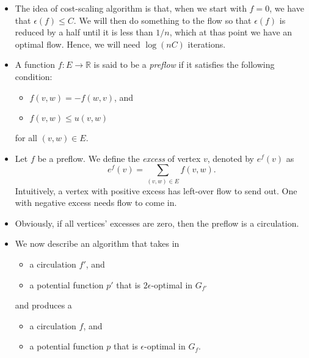 \documentclass[10pt]{article}
\begin{document}
\begin{itemize}
\begin{proof}
          Now, for any cycle of length more than $n$, we can break it to
          a number of cycles of length at most $n$. So, its cost is greater
          than or equal to 0 as well. In conclusion, there is no negative-cost
          cycle, and $f$ is optimal.
        \end{proof}
      
      \item The idea of cost-scaling algorithm is that, when we start with $f = 0$,
        we have that $\epsilon(f) \leq C.$ We will then do something to the flow
        so that $\epsilon(f)$ is reduced by a half until it is less than $1/n$,
        which at thas point we have an optimal flow. Hence, we will need $\log(nC)$
        iterations.
        
      \item A function $f: E \rightarrow \mathbb{R}$ is said to be a \emph{preflow}
        if it satisfies the following condition:
        \begin{itemize}
          \item $f(v,w) = -f(w,v)$, and
          \item $f(v,w) \leq u(v,w)$
        \end{itemize}
        for all $(v,w) \in E.$
        
      \item Let $f$ be a preflow. We define the \emph{excess} of vertex $v$, denoted
        by $e^f(v)$ as $$e^f(v) = \sum_{(v,w) \in E} f(v,w).$$
        Intuitively, a vertex with positive excess has left-over flow to send out. 
        One with negative excess needs flow to come in.
        
      \item Obviously, if all vertices' excesses are zero, then the preflow
        is a circulation.
        
      \item We now describe an algorithm that takes in 
        \begin{itemize}
          \item a circulation $f'$, and
          \item a potential function $p'$ that is $2\epsilon$-optimal in $G_{f'}$
        \end{itemize}
        and produces a
        \begin{itemize}
          \item a circulation $f$, and
          \item a potential function $p$ that is $\epsilon$-optimal in $G_{f}$.
        \end{itemize}
        

\end{itemize}
\end{document}
